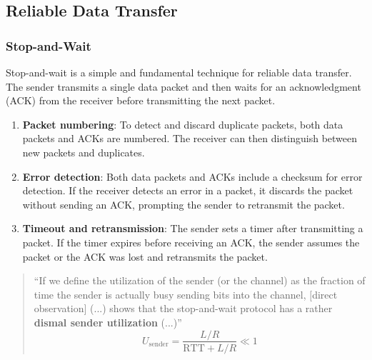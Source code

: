\subsection[3.4 Reliable Data Transfer]{\hspace*{0.075 em}\raisebox{0.2 em}{$\pmb{\drsh}$} Reliable Data Transfer}
\label{subsec:reliable-data-transfer}

\subsubsection[3.4.1 Stop-and-Wait]{\hspace*{0.075 em}\raisebox{0.2 em}{$\pmb{\rightarrow}$} Stop-and-Wait}
\label{subsec:stop-and-wait}

Stop-and-wait is a simple and fundamental technique for reliable data transfer. The sender transmits a single data packet and then waits for an acknowledgment (ACK) from the receiver before transmitting the next packet.

\vspace{-0.5em}
\begin{enumerate}
    \item \textbf{Packet numbering}: To detect and discard duplicate packets, both data packets and ACKs are numbered. The receiver can then distinguish between new packets and duplicates.
    
    \item \textbf{Error detection}: Both data packets and ACKs include a checksum for error detection. If the receiver detects an error in a packet, it discards the packet without sending an ACK, prompting the sender to retransmit the packet.
    
    \item \textbf{Timeout and retransmission}: The sender sets a timer after transmitting a packet. If the timer expires before receiving an ACK, the sender assumes the packet or the ACK was lost and retransmits the packet.
\end{enumerate}

\begin{quote}
    ``If we define the utilization of the sender (or the channel) as the fraction of time the sender is actually busy sending bits into the channel, $[$direct observation$]$ (...) shows that the stop-and-wait protocol has a rather \textbf{dismal sender utilization} (...)''\cite{Kurose2017}
    $$
        U_\text{sender} = \frac{L/R}{\text{RTT} + L/R} \ll 1
    $$
\end{quote}

